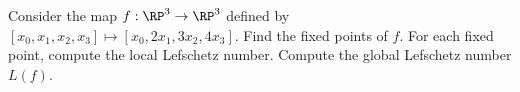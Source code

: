Consider the map $f:\RP^3\rightarrow \RP^3$ defined by
$[x_0,x_1,x_2,x_3]\mapsto [x_0,2x_1,3x_2,4x_3]$. Find the fixed points
of $f$. For each fixed point, compute the local Lefschetz
number. Compute the global Lefschetz number $L(f)$.
